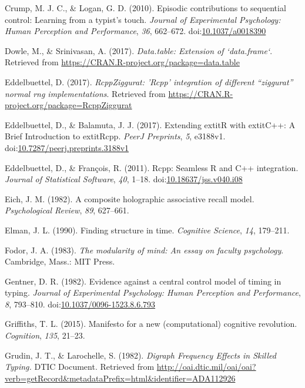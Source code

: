\documentclass[floatsintext,man]{apa6}
\theoremstyle{definition}
\theoremstyle{definition}
\theoremstyle{definition}
\theoremstyle{remark}
\begin{document}
\hypertarget{ref-crump_episodic_2010}{}
Crump, M. J. C., \& Logan, G. D. (2010). Episodic contributions to
sequential control: Learning from a typist's touch. \emph{Journal of
Experimental Psychology: Human Perception and Performance}, \emph{36},
662--672. doi:\href{https://doi.org/10.1037/a0018390}{10.1037/a0018390}

\hypertarget{ref-R-data.table}{}
Dowle, M., \& Srinivasan, A. (2017). \emph{Data.table: Extension of
`data.frame`}. Retrieved from
\url{https://CRAN.R-project.org/package=data.table}

\hypertarget{ref-R-RcppZiggurat}{}
Eddelbuettel, D. (2017). \emph{RcppZiggurat: 'Rcpp' integration of
different ``ziggurat'' normal rng implementations}. Retrieved from
\url{https://CRAN.R-project.org/package=RcppZiggurat}

\hypertarget{ref-R-Rcpp_b}{}
Eddelbuettel, D., \& Balamuta, J. J. (2017). Extending extitR with
extitC++: A Brief Introduction to extitRcpp. \emph{PeerJ Preprints},
\emph{5}, e3188v1.
doi:\href{https://doi.org/10.7287/peerj.preprints.3188v1}{10.7287/peerj.preprints.3188v1}

\hypertarget{ref-R-Rcpp_a}{}
Eddelbuettel, D., \& François, R. (2011). Rcpp: Seamless R and C++
integration. \emph{Journal of Statistical Software}, \emph{40}, 1--18.
doi:\href{https://doi.org/10.18637/jss.v040.i08}{10.18637/jss.v040.i08}

\hypertarget{ref-eich_composite_1982}{}
Eich, J. M. (1982). A composite holographic associative recall model.
\emph{Psychological Review}, \emph{89}, 627--661.

\hypertarget{ref-elman_finding_1990}{}
Elman, J. L. (1990). Finding structure in time. \emph{Cognitive
Science}, \emph{14}, 179--211.

\hypertarget{ref-fodor_modularity_1983}{}
Fodor, J. A. (1983). \emph{The modularity of mind: An essay on faculty
psychology}. Cambridge, Mass.: MIT Press.

\hypertarget{ref-GentnerEvidencecentralcontrol1982}{}
Gentner, D. R. (1982). Evidence against a central control model of
timing in typing. \emph{Journal of Experimental Psychology: Human
Perception and Performance}, \emph{8}, 793--810.
doi:\href{https://doi.org/10.1037/0096-1523.8.6.793}{10.1037/0096-1523.8.6.793}

\hypertarget{ref-griffiths_manifesto_2015}{}
Griffiths, T. L. (2015). Manifesto for a new (computational) cognitive
revolution. \emph{Cognition}, \emph{135}, 21--23.

\hypertarget{ref-grudin_digraph_1982}{}
Grudin, J. T., \& Larochelle, S. (1982). \emph{Digraph Frequency Effects
in Skilled Typing.} DTIC Document. Retrieved from
\url{http://oai.dtic.mil/oai/oai?verb=getRecord\&metadataPrefix=html\&identifier=ADA112926}
\end{document}
